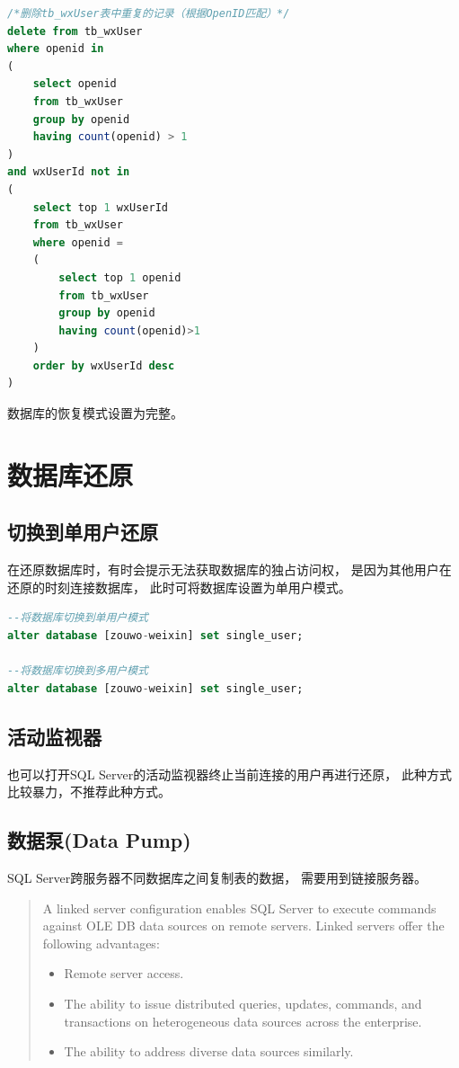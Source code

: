 \documentclass{book}
\begin{document}
\begin{lstlisting}[language=SQL]
/*删除tb_wxUser表中重复的记录（根据OpenID匹配）*/
delete from tb_wxUser
where openid in 
(
	select openid 
	from tb_wxUser 
	group by openid 
	having count(openid) > 1
)
and wxUserId not in 
(
	select top 1 wxUserId
	from tb_wxUser
	where openid =
	(
		select top 1 openid
		from tb_wxUser	 
		group by openid 
		having count(openid)>1		
	)
	order by wxUserId desc	
)
\end{lstlisting}

数据库的恢复模式设置为完整。

\section{数据库还原}

\subsection{切换到单用户还原}

在还原数据库时，有时会提示无法获取数据库的独占访问权，
是因为其他用户在还原的时刻连接数据库，
此时可将数据库设置为单用户模式。

\begin{lstlisting}[language=SQL]
--将数据库切换到单用户模式
alter database [zouwo-weixin] set single_user;

--将数据库切换到多用户模式
alter database [zouwo-weixin] set single_user;
\end{lstlisting}

\subsection{活动监视器}

也可以打开SQL Server的活动监视器终止当前连接的用户再进行还原，
此种方式比较暴力，不推荐此种方式。

\subsection{数据泵(Data Pump)}

SQL Server跨服务器不同数据库之间复制表的数据，
需要用到链接服务器。

\begin{quotation}
A linked server configuration enables SQL Server to 
execute commands against OLE DB data sources on remote servers. 
Linked servers offer the following advantages:

\begin{itemize}

\item{Remote server access.}

\item{The ability to issue distributed queries, updates, commands, and transactions on heterogeneous data sources across the enterprise.}

\item{The ability to address diverse data sources similarly.}

\end{itemize}

\end{quotation}
\end{document}
